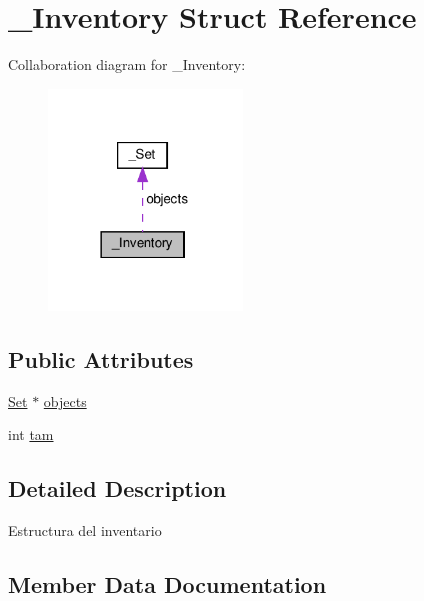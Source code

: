 \hypertarget{struct__Inventory}{}\section{\+\_\+\+Inventory Struct Reference}
\label{struct__Inventory}


Collaboration diagram for \+\_\+\+Inventory\+:\nopagebreak
\begin{figure}[H]
\begin{center}
\leavevmode
\includegraphics[width=146pt]{struct__Inventory__coll__graph}
\end{center}
\end{figure}
\subsection*{Public Attributes}
\begin{DoxyCompactItemize}
\item 
\hyperlink{set_8h_a6d3b7f7c92cbb4577ef3ef7ddbf93161}{Set} $\ast$ \hyperlink{struct__Inventory_a478e4b50a62b9e7d5b17e335319faa97}{objects}
\item 
int \hyperlink{struct__Inventory_ae6dad9356e59d5e9ce48b09861be1516}{tam}
\end{DoxyCompactItemize}


\subsection{Detailed Description}
Estructura del inventario 

\subsection{Member Data Documentation}
\mbox{\label{struct__Inventory_a478e4b50a62b9e7d5b17e335319faa97}} 
